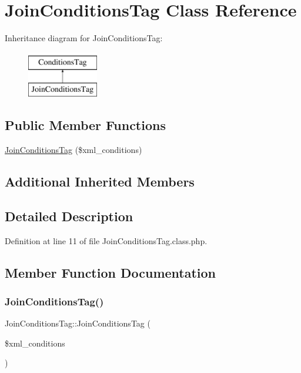 \hypertarget{classJoinConditionsTag}{}\section{Join\+Conditions\+Tag Class Reference}
\label{classJoinConditionsTag}
Inheritance diagram for Join\+Conditions\+Tag\+:\begin{figure}[H]
\begin{center}
\leavevmode
\includegraphics[height=2.000000cm]{classJoinConditionsTag}
\end{center}
\end{figure}
\subsection*{Public Member Functions}
\begin{DoxyCompactItemize}
\item 
\hyperlink{classJoinConditionsTag_aa482f0c93e57933796566139e1b74f0e}{Join\+Conditions\+Tag} (\$xml\+\_\+conditions)
\end{DoxyCompactItemize}
\subsection*{Additional Inherited Members}


\subsection{Detailed Description}


Definition at line 11 of file Join\+Conditions\+Tag.\+class.\+php.



\subsection{Member Function Documentation}
\mbox{\label{classJoinConditionsTag_aa482f0c93e57933796566139e1b74f0e}} 
\subsubsection{\texorpdfstring{Join\+Conditions\+Tag()}{JoinConditionsTag()}}
{\footnotesize\ttfamily Join\+Conditions\+Tag\+::\+Join\+Conditions\+Tag (\begin{DoxyParamCaption}\item[{}]{\$xml\+\_\+conditions }\end{DoxyParamCaption})}

